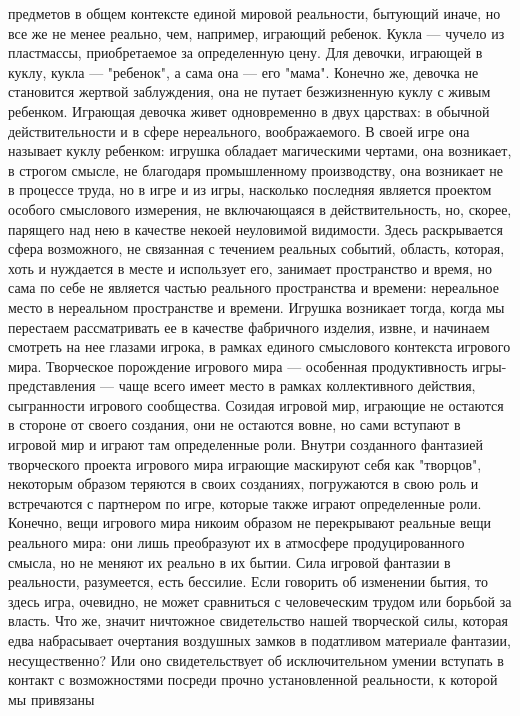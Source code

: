 \documentclass[12pt]{article}
\begin{document}
предметов в общем контексте единой мировой реальности, бытующий иначе, но все же не менее реально, чем,
например,  играющий  ребенок.  Кукла  ---  чучело  из  пластмассы,  приобретаемое  за  определенную  цену.  Для
девочки, играющей в куклу, кукла --- "ребенок", а сама она --- его "мама". Конечно же, девочка не становится
жертвой заблуждения, она не путает безжизненную куклу с живым ребенком.
Играющая девочка живет одновременно в двух царствах: в обычной действительности и в сфере нереального,
воображаемого.  В  своей  игре  она  называет  куклу  ребенком:  игрушка  обладает  магическими  чертами,  она
возникает, в строгом смысле, не благодаря промышленному производству, она возникает не в процессе труда, но
в игре и из игры, насколько последняя является проектом особого смыслового измерения, не включающаяся в
действительность, но, скорее, парящего над нею в качестве некоей неуловимой видимости. Здесь раскрывается
сфера возможного, не связанная с течением реальных событий, область, которая, хоть и нуждается в месте и
использует его, занимает пространство и время, но сама по себе не является частью реального пространства и
времени:  нереальное  место  в  нереальном  пространстве  и  времени.  Игрушка  возникает  тогда,  когда  мы
перестаем рассматривать ее в качестве фабричного изделия, извне, и начинаем смотреть на нее глазами игрока,
в рамках единого смыслового контекста игрового мира. Творческое порождение игрового мира --- особенная
продуктивность игры-представления --- чаще всего имеет место в рамках коллективного действия, сыгранности
игрового сообщества. Созидая игровой мир, играющие не остаются в стороне от своего создания, они не
остаются  вовне,  но  сами  вступают  в  игровой  мир  и  играют  там  определенные  роли.  Внутри  созданного
фантазией творческого проекта игрового мира играющие маскируют себя как "творцов", некоторым образом
теряются в своих созданиях, погружаются в свою роль и встречаются с партнером по игре, которые также
играют определенные роли. Конечно, вещи игрового мира никоим образом не перекрывают реальные вещи
реального мира: они лишь преобразуют их в атмосфере продуцированного смысла, но не меняют их реально в
их бытии. Сила игровой фантазии в реальности, разумеется, есть бессилие. Если говорить об изменении бытия,
то здесь игра, очевидно, не может сравниться с человеческим трудом или борьбой за власть. Что же, значит
ничтожное свидетельство нашей творческой силы, которая едва набрасывает очертания воздушных замков в
податливом  материале  фантазии,  несущественно?  Или  оно  свидетельствует  об  исключительном  умении
вступать в контакт с возможностями посреди прочно установленной реальности, к которой мы привязаны
\end{document}
